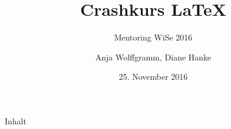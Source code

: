 \documentclass[ucs,9pt,english,ngerman,xcolor=table]{beamer}
\title{Crashkurs LaTeX}
\subtitle{Mentoring WiSe 2016}
\author{Anja Wolffgramm, Diane Hanke}
\institute[Freie Universität Berlin] %
{Freie Universität Berlin}
\date{25. November 2016}
\begin{document}
\begin{frame}[plain]
  \titlepage
\end{frame}

\begin{frame}{Inhalt}%
	\begin{multicols}{2}%
		\tableofcontents
	\end{multicols}
\end{frame}


%
%
%
%
%
% 
%
%
%
%
%
%
\end{document}
